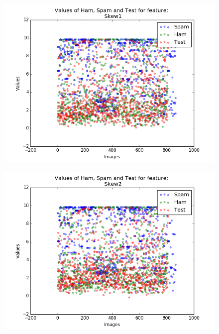 \begin{figure}[h]
	\centering
	\begin{minipage}{.5\textwidth}
		\centering
		\includegraphics[width=\linewidth]{images/appA/Skew1_values_scatter}
		\label{fig:Skew1_values_scatter}
	\end{minipage}%
	\begin{minipage}{.5\textwidth}
		\centering
		\includegraphics[width=\linewidth]{images/appA/Skew2_values_scatter}
		\label{fig:Skew2_values_scatter}
	\end{minipage}
\end{figure}

